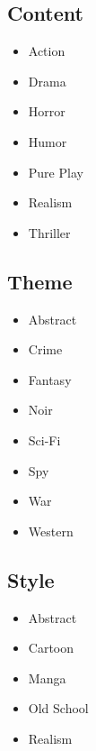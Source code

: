 \subsection{Content}

\begin{itemize}[label=\textbullet]
  \item Action
  \item Drama
  \item Horror
  \item Humor
  \item Pure Play
  \item Realism
  \item Thriller
\end{itemize}

\subsection{Theme}

\begin{itemize}[label=\textbullet]
  \item Abstract
  \item Crime
  \item Fantasy
  \item Noir
  \item Sci-Fi
  \item Spy
  \item War
  \item Western
\end{itemize}

\subsection{Style}

\begin{itemize}[label=\textbullet]
  \item Abstract
  \item Cartoon
  \item Manga
  \item Old School
  \item Realism
\end{itemize}
